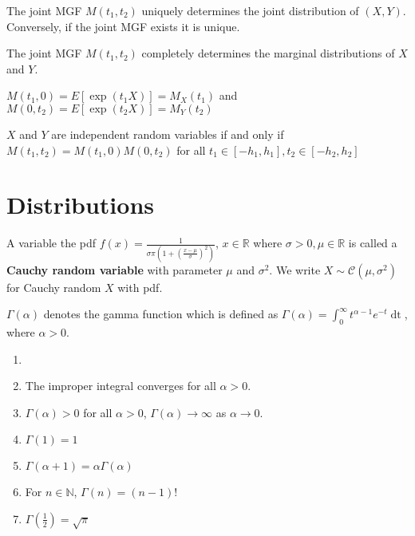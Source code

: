 \begin{thm}
    The joint MGF $M(t_1, t_2)$ uniquely determines the joint distribution of $(X, Y)$.
    Conversely, if the joint MGF exists it is unique.
\end{thm}

\begin{thm}
    The joint MGF $M(t_1, t_2)$ completely determines the marginal distributions of $X$ and $Y$. 

    $M(t_1, 0) = E[\exp(t_1 X)] = M_X (t_1)$ and $M(0, t_2) = E[\exp(t_2 X)] = M_Y(t_2)$
\end{thm}

\begin{thm}
    $X$ and $Y$ are independent random variables if and only if $M(t_1, t_2) = M(t_1, 0) M(0, t_2)$ for all $t_1 \in [-h_1, h_1], t_2 \in [-h_2, h_2]$
\end{thm}

\section{Distributions}

\begin{defn}
    A variable the pdf $f(x) = \displaystyle \frac{1}{\sigma \pi (1 + \left( \frac{x - \mu}{\sigma} \right)^2 )}$, $x \in \mathbb{R}$ where $\sigma > 0, \mu \in \mathbb{R}$ is called a \textbf{Cauchy random variable} with parameter $\mu$ and $\sigma^2$. 
    We write $X \sim \mathcal{C}(\mu, \sigma^2)$ for Cauchy random $X$ with pdf.
\end{defn}

\begin{defn}
    $\Gamma(\alpha)$ denotes the gamma function which is defined as $\Gamma(\alpha) = \displaystyle\int_0^\infty t ^{\alpha - 1} e ^{-t} \mathop{\mathrm{d} t}$, where $\alpha > 0$.
\end{defn}

\begin{thm}
    \begin{enumerate}
        \item[]
        \item The improper integral converges for all $\alpha > 0$. 
        \item $\Gamma(\alpha) > 0$  for all $\alpha > 0$, $\Gamma(\alpha) \to \infty$ as $\alpha \to 0$. 
        \item $\Gamma(1) = 1$
        \item $\Gamma(\alpha + 1) = \alpha \Gamma(\alpha)$
        \item For $n \in \mathbb{N}$, $\Gamma(n) = (n-1)!$
        \item $\Gamma(\frac{1}{2}) = \sqrt{\pi}$
    \end{enumerate}
\end{thm}

